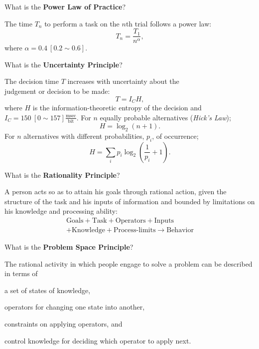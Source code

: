 \begin{flashcard}[Question]{What is the \textbf{Power Law of Practice}?}
\begin{center}
The time $T_n$ to perform a task on the $n$th trial follows a power law:
\begin{displaymath}
T_n = \frac{T_1}{n^\alpha},
\end{displaymath}
where $\alpha = 0.4~[0.2 \sim 0.6]$.
\end{center}
\end{flashcard}

\begin{flashcard}[Question]{What is the \textbf{Uncertainty Principle}?}
\begin{center}
The decision time $T$ increases with uncertainty about the\\judgement or decision to be made:
\begin{displaymath}
T = I_C H,
\end{displaymath}
where $H$ is the information-theoretic entropy of the decision and $I_C = 150~[0 \sim 157] \frac{\text{msec}}{\text{bit}}$. For $n$ equally probable alternatives (\textit{Hick's Law});
\begin{displaymath}
H = \log_2(n + 1).
\end{displaymath}
For $n$ alternatives with different probabilities, $p_i$, of occurrence;
\begin{displaymath}
H = \sum_i p_i \log_2 (\frac{1}{p_i} + 1).
\end{displaymath}
\end{center}
\end{flashcard}

\begin{flashcard}[Question]{What is the \textbf{Rationality Principle}?}
\begin{center}
A person acts so as to attain his goals through rational action, given the structure of the task and his inputs of information and bounded by limitations on his knowledge and processing ability:
\begin{align*}
\text{Goals} + \text{Task} + \text{Operators} + \text{Inputs}\\ + \text{Knowledge} + \text{Process-limits} \rightarrow \text{Behavior}
\end{align*}
\end{center}
\end{flashcard}

\begin{flashcard}[Question]{What is the \textbf{Problem Space Principle}?}
\begin{center}
The rational activity in which people engage to solve a problem can be described in terms of
\begin{enumerate*}
\item a set of states of knowledge,
\item operators for changing one state into another,
\item constraints on applying operators, and
\item control knowledge for deciding which operator to apply next.
\end{enumerate*}
\end{center}
\end{flashcard}

